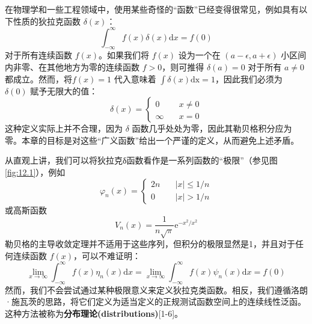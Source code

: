 在物理学和一些工程领域中，使用某些奇怪的``函数''已经变得很常见，例如具有以下性质的狄拉克函数
$\delta(x)$：
 $$
\int_{-\infty}^{\infty} f(x) \delta(x) \mathrm{d} x=f(0)
$$
对于所有连续函数 $f(x)$。如果我们将 $f(x)$ 设为一个在
$(a-\epsilon, a+\epsilon)$ 小区间内非零、在其他地方为零的连续函数
$f > 0$，则可推得 $\delta(a) = 0$ 对于所有 $a \neq 0$都成立。然而，将$f(x)=1$ 代入意味着 $\int \delta(x) \mathrm{dx}=1$，因此我们必须为
$\delta(0)$ 赋予无限大的值：
 $$
\delta(x)= \begin{cases}0 & \quad x \neq 0 \\ \infty & \quad x=0\end{cases}
$$
这种定义实际上并不合理，因为 $\delta$
函数几乎处处为零，因此其勒贝格积分应为零。本章的目标是对这些``广义函数''给出一个严谨的定义，从而避免上述矛盾。

从直观上讲，我们可以将狄拉克δ函数看作是一系列函数的``极限''（参见图\ref{fig:12.1}），例如
\begin{equation}
  \varphi_n(x)= \begin{cases}2 n & \quad|x| \leq 1 / n \\ 0 & \quad|x|>1 / n\end{cases}
\end{equation}
或高斯函数
 $$
V_n(x)=\frac{1}{n \sqrt{\pi}} \mathrm{e}^{-x^2 / x^2}
$$
勒贝格的主导收敛定理并不适用于这些序列，但积分的极限显然是1，并且对于任何连续函数
$f(x)$，可以不难证明：
 $$
\lim _{x \rightarrow \infty} \int_{-\infty}^{\infty} f(x) \eta_n(x) \mathrm{d} x=\lim _{x \rightarrow \infty} \int_{-\infty}^{\infty} f(x) \psi_n(x) \mathrm{d} x=f(0)
$$
然而，我们不会尝试通过某种极限意义来定义狄拉克类函数。相反，我们遵循洛朗·施瓦茨的思路，将它们定义为适当定义的正规测试函数空间上的连续线性泛函。这种方法被称为\textbf{分布理论(distributions)}{[}1-6{]}。
